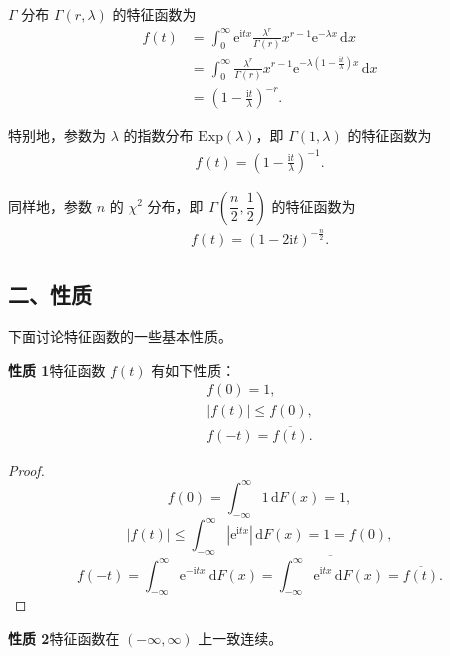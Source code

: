 \documentclass[../../main.tex]{subfiles}
\begin{document}
\begin{example}[$\Gamma$ 分布]\label{example:ch04-Gamma特征函数}
$\Gamma$ 分布 $\Gamma(r,\lambda)$ 的特征函数为
\begin{align}
f(t)&=\int_0^{\infty}\mathrm{e}^{\mathrm{i}tx}\frac{\lambda^r}{\Gamma(r)}x^{r-1}\mathrm{e}^{-\lambda x}\,\mathrm{d}x\nonumber\\
&=\int_0^{\infty}\frac{\lambda^r}{\Gamma(r)}x^{r-1}\mathrm{e}^{-\lambda(1-\frac{\mathrm{i}t}{\lambda})x}\,\mathrm{d}x\nonumber\\
&=\left(1-\frac{\mathrm{i}t}{\lambda}\right)^{-r}.\label{align:ch04-Gamma特征函数}
\end{align}

特别地，参数为 $\lambda$ 的指数分布 $\mathrm{Exp}(\lambda)$，即 $\Gamma(1,\lambda)$ 的特征函数为
\begin{align}
f(t)=\left(1-\frac{\mathrm{i}t}{\lambda}\right)^{-1}.\label{align:ch04-指数特征函数}
\end{align}

同样地，参数 $n$ 的 $\chi^2$ 分布，即 $\Gamma\left(\dfrac{n}{2},\dfrac12\right)$ 的特征函数为
\begin{align}
f(t)=(1-2\mathrm{i}t)^{-\frac{n}{2}}.\label{align:ch04-卡方特征函数}
\end{align}
\end{example}

\subsection*{二、性质}

下面讨论特征函数的一些基本性质。

\noindent\textbf{性质 1}\quad 特征函数 $f(t)$ 有如下性质：
\begin{align}
f(0)=1,\label{align:ch04-f0=1}\\
|f(t)|\leqslant f(0),\label{align:ch04-模长界}\\
f(-t)=\overline{f(t)}.\label{align:ch04-共轭}
\end{align}

\begin{proof}
\[
f(0)=\int_{-\infty}^{\infty}1\,\mathrm{d}F(x)=1,
\]
\[
|f(t)|\leqslant\int_{-\infty}^{\infty}|\mathrm{e}^{\mathrm{i}tx}|\,\mathrm{d}F(x)=1=f(0),
\]
\[
f(-t)=\int_{-\infty}^{\infty}\mathrm{e}^{-\mathrm{i}tx}\,\mathrm{d}F(x)
=\overline{\int_{-\infty}^{\infty}\mathrm{e}^{\mathrm{i}tx}\,\mathrm{d}F(x)}=\overline{f(t)}.
\]
\end{proof}

\noindent\textbf{性质 2}\quad 特征函数在 $(-\infty,\infty)$ 上一致连续。
\end{document}
